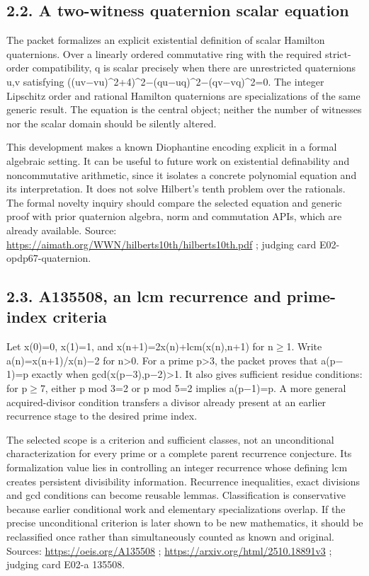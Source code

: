 \documentclass[11pt,a4paper]{article}
\begin{document}
\subsection{2.2. A two-witness quaternion scalar equation}
The packet formalizes an explicit existential definition of scalar Hamilton quaternions. Over a linearly ordered commutative ring with the required strict-order compatibility, q is scalar precisely when there are unrestricted quaternions u,v satisfying ((uv\ensuremath{-}vu)\textasciicircum{}2+4)\textasciicircum{}2\ensuremath{-}(qu\ensuremath{-}uq)\textasciicircum{}2\ensuremath{-}(qv\ensuremath{-}vq)\textasciicircum{}2=0. The integer Lipschitz order and rational Hamilton quaternions are specializations of the same generic result. The equation is the central object; neither the number of witnesses nor the scalar domain should be silently altered.

This development makes a known Diophantine encoding explicit in a formal algebraic setting. It can be useful to future work on existential definability and noncommutative arithmetic, since it isolates a concrete polynomial equation and its interpretation. It does not solve Hilbert's tenth problem over the rationals. The formal novelty inquiry should compare the selected equation and generic proof with prior quaternion algebra, norm and commutation APIs, which are already available. Source: \url{https://aimath.org/WWN/hilberts10th/hilberts10th.pdf} ; judging card E02-opdp67-quaternion.

\subsection{2.3. A135508, an lcm recurrence and prime-index criteria}
Let x(0)=0, x(1)=1, and x(n+1)=2x(n)+lcm(x(n),n+1) for n\ensuremath{\geq}1. Write a(n)=x(n+1)/x(n)\ensuremath{-}2 for n>0. For a prime p>3, the packet proves that a(p\ensuremath{-}1)=p exactly when gcd(x(p\ensuremath{-}3),p\ensuremath{-}2)>1. It also gives sufficient residue conditions: for p\ensuremath{\geq}7, either p mod 3=2 or p mod 5=2 implies a(p\ensuremath{-}1)=p. A more general acquired-divisor condition transfers a divisor already present at an earlier recurrence stage to the desired prime index.

The selected scope is a criterion and sufficient classes, not an unconditional characterization for every prime or a complete parent recurrence conjecture. Its formalization value lies in controlling an integer recurrence whose defining lcm creates persistent divisibility information. Recurrence inequalities, exact divisions and gcd conditions can become reusable lemmas. Classification is conservative because earlier conditional work and elementary specializations overlap. If the precise unconditional criterion is later shown to be new mathematics, it should be reclassified once rather than simultaneously counted as known and original. Sources: \url{https://oeis.org/A135508} ; \url{https://arxiv.org/html/2510.18891v3} ; judging card E02-a 135508.
\end{document}
